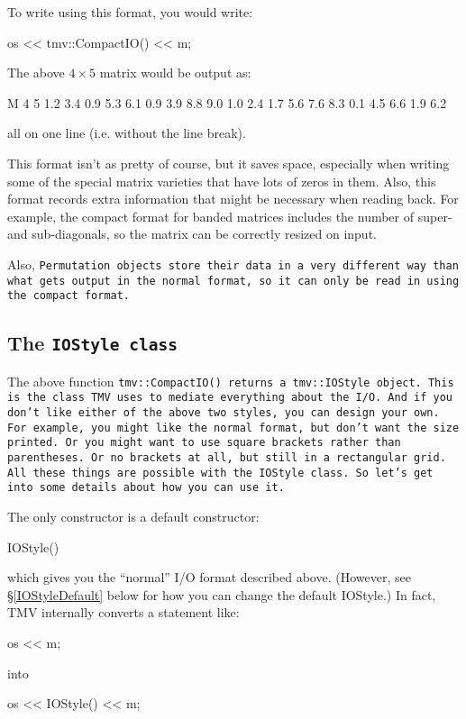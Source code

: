 To write using this format, you would write:
\begin{tmvcode}
os << tmv::CompactIO() << m;
\end{tmvcode}

The above $4\times5$ matrix would be output as:
\begin{tmvcode}
M 4 5 1.2 3.4 0.9 5.3 6.1 0.9 3.9 8.8 9.0 1.0 2.4 1.7 5.6 7.6 8.3 0.1 4.5 
6.6 1.9 6.2
\end{tmvcode}
all on one line (i.e. without the line break).  

This format isn't as pretty of course, but it saves space, especially when writing some of the special matrix varieties that have lots of zeros in them.  Also, this format records extra information that might be necessary when reading back.  For example, the compact format for banded matrices includes the number of super- and sub-diagonals, so the matrix can be correctly resized on input.  

Also, \tt{Permutation} objects store their data in a very different way than what gets output in the normal format, so it can only be read in using the compact format.  

\subsection[The IOStyle class]{The \tt{IOStyle} class}

The above function \tt{tmv::CompactIO()} returns a \tt{tmv::IOStyle} object.  This is the class TMV uses to mediate everything about the I/O.  And if you don't like either of the above two styles, you can design your own.  For example, you might like the normal format, but don't want the size printed.  Or you might want to use square brackets rather than parentheses.  Or no brackets at all, but still in a rectangular grid.  All these things are possible with the \tt{IOStyle} class.  So let's get into some details about how you can use it.

The only constructor is a default constructor:
\begin{tmvcode}
IOStyle()
\end{tmvcode}
which gives you the ``normal'' I/O format described above.  (However, see \S\ref{IOStyleDefault} below for how you can change the default IOStyle.)  
In fact, TMV internally converts a statement like:
\begin{tmvcode}
os << m;
\end{tmvcode}
into
\begin{tmvcode}
os << IOStyle() << m;
\end{tmvcode}

